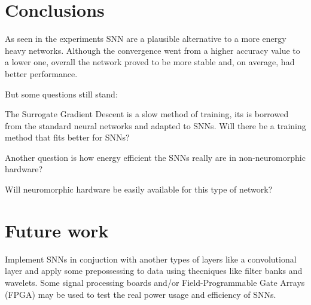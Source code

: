 \section{Conclusions}
\label{sec:conclusions}
	\par As seen in the experiments SNN are a plausible alternative to a more energy heavy networks. Although the convergence went from a higher accuracy value to a lower one, overall the network proved to be more stable and, on average, had better performance.
	
	
	But some questions still stand: 
	\par The Surrogate Gradient Descent is a slow method of training, its is borrowed from the standard neural networks and adapted to SNNs. Will there be a training method that fits better for SNNs? 
	\par Another question is how energy efficient the SNNs really are in non-neuromorphic hardware?
	\par Will neuromorphic hardware be easily available for this type of network?
	
\section{Future work}
	\label{sec:future}
	\par Implement SNNs in conjuction with another types of layers like a convolutional layer and apply some prepossessing to data using thecniques like filter banks and wavelets. Some signal processing boards and/or Field-Programmable Gate Arrays (FPGA) may be used to test the real power usage and efficiency of SNNs.